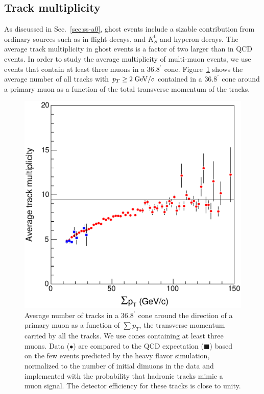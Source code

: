 \documentclass[aps,prd,preprint,floatfix,nofootinbib,superscriptaddress,showpacs,amssymb]{revtex4}
\def\deg{^\circ}
\begin{document}
\subsection{Track multiplicity}
\label{sec:ss-trkmul}
 As discussed in Sec.~\ref{sec:ss-a0}, ghost events include a sizable
 contribution from ordinary sources such as in-flight-decays, and $K^0_S$
 and hyperon decays. The average track multiplicity in ghost events is 
 a factor of two larger than in QCD events. In order to study the average
 multiplicity of multi-muon events, we use events that contain at least
 three muons in a $36.8^{\deg}$ cone. Figure~\ref{fig:fig_17} shows the
 average number of all tracks with $p_T \geq 2 \; {\rm GeV/}c$ contained in a
 $36.8^{\deg}$ cone around a primary muon as a function of the total
 transverse momentum of the tracks.
 \begin{figure}
 \begin{center}
 \vspace{-0.3in}
 \leavevmode
 \includegraphics*[width=\textwidth]{fa0_17_new.eps}
 \caption[]{Average number of tracks in a $36.8^{\deg}$ cone around the
            direction of a primary muon as a function of $\sum p_T$, the
            transverse momentum carried by all the tracks. We use cones
            containing at least three muons. Data ($\bullet$) are compared
            to the QCD expectation ({\tiny $\blacksquare$}) based on the
            few events predicted by the heavy flavor simulation, normalized
            to the number of initial dimuons in the data and implemented
            with the probability that hadronic tracks mimic a muon signal.
            The detector efficiency for these tracks is close to unity.}
 \label{fig:fig_17}
 \end{center}
 \end{figure}
\end{document}
